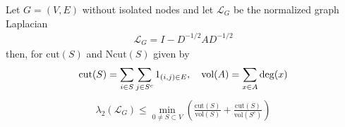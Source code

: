 \begin{thm}[]
  Let $G = (V,E)$ without isolated nodes and let $\mathcal{L}_G$ be the normalized graph Laplacian
  \begin{align*}
    \mathcal{L}_G = I - D^{-1/2}AD^{-1/2}
  \end{align*}
  then, for $\text{cut}(S)$ and $\text{Ncut}(S)$ given by
  \begin{align*}
    \text{cut}(S) = \sum_{i\in S}\sum_{j \in S^{c}} 1_{(i,j) \in E}, \quad \text{vol}(A) = \sum_{x \in A}\operatorname{deg}(x)
  \end{align*}
  \begin{align*}
    \lambda_2(\mathcal{L}_G) \leq \min_{0 \neq S \subset V} \left(
      \frac{\text{cut}(S)}{\text{vol}(S)}
      +
      \frac{\text{cut}(S)}{\text{vol}(S^{c})}
    \right)
  \end{align*}
\end{thm}
